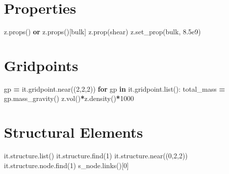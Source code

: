 \documentclass[a4paper, nobind]{templates/ociamthesis}
\newenvironment{Shaded}{\begin{snugshade}}{\end{snugshade}}
\newcommand{\BuiltInTok}[1]{#1}
\newcommand{\ControlFlowTok}[1]{\textcolor[rgb]{0.13,0.29,0.53}{\textbf{#1}}}
\newcommand{\DecValTok}[1]{\textcolor[rgb]{0.00,0.00,0.81}{#1}}
\newcommand{\FloatTok}[1]{\textcolor[rgb]{0.00,0.00,0.81}{#1}}
\newcommand{\KeywordTok}[1]{\textcolor[rgb]{0.13,0.29,0.53}{\textbf{#1}}}
\newcommand{\NormalTok}[1]{#1}
\newcommand{\OperatorTok}[1]{\textcolor[rgb]{0.81,0.36,0.00}{\textbf{#1}}}
\newcommand{\StringTok}[1]{\textcolor[rgb]{0.31,0.60,0.02}{#1}}
\renewenvironment{Shaded}
{
  \vspace{10pt}%
  \begin{snugshade}%
}{%
  \end{snugshade}%
  \vspace{8pt}%
}
\begin{document}
\hypertarget{properties-3}{%
\section{Properties}\label{properties-3}}

\begin{Shaded}
\begin{Highlighting}[]
\NormalTok{z.props() }\KeywordTok{or}\NormalTok{ z.props()[}\StringTok{\textquotesingle{}bulk\textquotesingle{}}\NormalTok{]}
\NormalTok{z.prop(}\StringTok{\textquotesingle{}shear\textquotesingle{}}\NormalTok{)}
\NormalTok{z.set\_prop(}\StringTok{\textquotesingle{}bulk\textquotesingle{}}\NormalTok{, }\FloatTok{8.5e9}\NormalTok{)}
\end{Highlighting}
\end{Shaded}

\hypertarget{gridpoints}{%
\section{Gridpoints}\label{gridpoints}}

\begin{Shaded}
\begin{Highlighting}[]
\NormalTok{gp }\OperatorTok{=}\NormalTok{ it.gridpoint.near((}\DecValTok{2}\NormalTok{,}\DecValTok{2}\NormalTok{,}\DecValTok{2}\NormalTok{))}
\ControlFlowTok{for}\NormalTok{ gp }\KeywordTok{in}\NormalTok{ it.gridpoint.}\BuiltInTok{list}\NormalTok{():}
\NormalTok{  total\_mass }\OperatorTok{=}\NormalTok{ gp.mass\_gravity()}
\NormalTok{z.vol()}\OperatorTok{*}\NormalTok{z.density()}\OperatorTok{*}\DecValTok{1000}
\end{Highlighting}
\end{Shaded}

\hypertarget{structural-elements}{%
\section{Structural Elements}\label{structural-elements}}

\begin{Shaded}
\begin{Highlighting}[]
\NormalTok{it.structure.}\BuiltInTok{list}\NormalTok{()}
\NormalTok{it.structure.find(}\DecValTok{1}\NormalTok{)}
\NormalTok{it.structure.near((}\DecValTok{0}\NormalTok{,}\DecValTok{2}\NormalTok{,}\DecValTok{2}\NormalTok{))}
\NormalTok{it.structure.node.find(}\DecValTok{1}\NormalTok{)}
\NormalTok{s\_node.links()[}\DecValTok{0}\NormalTok{]}
\end{Highlighting}
\end{Shaded}
\end{document}
